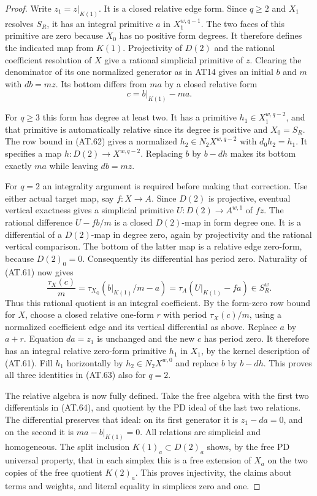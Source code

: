 \begin{proof}
Write $z_1=z|_{K(1)}$. It is a closed relative edge
form. Since $q\geq2$ and $X_1$ resolves $S_R$, it has
an integral primitive $a$ in $X_1^{w,q-1}$.
The two faces of this primitive are zero because
$X_0$ has no positive form degrees.
It therefore defines the indicated map from $K(1)$.
Projectivity of $D(2)$ and the rational coefficient
resolution of $X$ give a rational simplicial primitive
of $z$. Clearing the denominator of its one normalized
generator as in AT14 gives an initial $b$ and $m$
with $db=mz$. Its bottom differs from $ma$ by a
closed relative form
\[
                       c=b|_{K(1)}-ma.
 \tag{AT.66}
\]

For $q\geq3$ this form has degree at least two.
It has a primitive $h_1\in X_1^{w,q-2}$, and that
primitive is automatically relative since its degree
is positive and $X_0=S_R$.
The row bound in \textup{(AT.62)} gives a normalized
$h_2\in N_2X^{w,q-2}$ with $d_0h_2=h_1$.
It specifies a map $h:D(2)\to X^{w,q-2}$.
Replacing $b$ by $b-dh$ makes its bottom exactly
$ma$ while leaving $db=mz$.

For $q=2$ an integrality argument is required before
making that correction. Use either actual target map,
say $f:X\to A$. Since $D(2)$ is projective, eventual
vertical exactness gives a simplicial primitive
$U:D(2)\to A^{w,1}$ of $fz$.
The rational difference $U-fb/m$ is a closed
$D(2)$-map in form degree one. It is a differential
of a $D(2)$-map in degree zero, again by projectivity
and the rational vertical comparison.
The bottom of the latter map is a relative edge
zero-form, because $D(2)_0=0$.
Consequently its differential has period zero.
Naturality of \textup{(AT.61)} now gives
\[
 \frac{\tau_X(c)}m
   =\tau_{X_{\mathbb Q}}(b|_{K(1)}/m-a)
   =\tau_A(U|_{K(1)}-fa)\in S_R^w.
 \tag{AT.67}
\]
Thus this rational quotient is an integral coefficient.
By the form-zero row bound for $X$, choose a closed
relative one-form $r$ with period $\tau_X(c)/m$,
using a normalized coefficient edge and its vertical
differential as above.
Replace $a$ by $a+r$. Equation $da=z_1$ is unchanged
and the new $c$ has period zero.
It therefore has an integral relative zero-form
primitive $h_1$ in $X_1$, by the kernel description
of \textup{(AT.61)}.
Fill $h_1$ horizontally by $h_2\in N_2X^{w,0}$
and replace $b$ by $b-dh$.
This proves all three identities in \textup{(AT.63)}
also for $q=2$.

The relative algebra is now fully defined.
Take the free algebra with the first two differentials
in \textup{(AT.64)}, and quotient by the PD ideal
of the last two relations.
The differential preserves that ideal: on its first
generator it is $z_1-da=0$, and on the second it is
$ma-b|_{K(1)}=0$.
All relations are simplicial and homogeneous.
The split inclusion $K(1)_a\subset D(2)_a$ shows,
by the free PD universal property, that in each simplex
this is a free extension of $X_a$ on the two copies
of the free quotient $K(2)_a$.
This proves injectivity, the claims about terms and
weights, and literal equality in simplices zero and one.


\end{proof}
